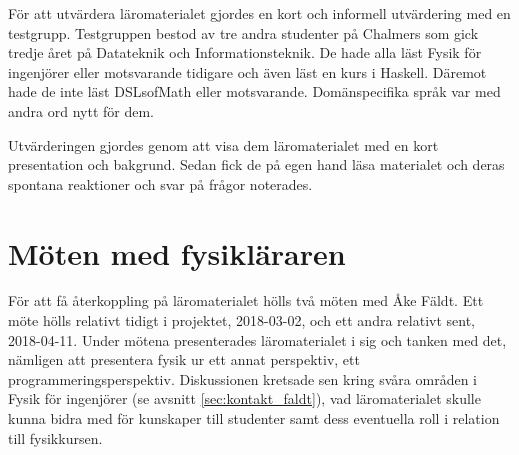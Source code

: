 För att utvärdera läromaterialet gjordes en kort och informell utvärdering med
en testgrupp. Testgruppen bestod av tre andra studenter på Chalmers som gick
tredje året på Datateknik och Informationsteknik. De hade alla läst Fysik för
ingenjörer eller motsvarande tidigare och även läst en kurs i Haskell.
Däremot hade de inte läst DSLsofMath eller motsvarande. Domänspecifika språk var
med andra ord nytt för dem.

Utvärderingen gjordes genom att visa dem läromaterialet med en kort
presentation och bakgrund. Sedan fick de på egen hand läsa materialet och deras
spontana reaktioner och svar på frågor noterades.

\section{Möten med fysikläraren}

För att få återkoppling på läromaterialet hölls två möten med Åke Fäldt. Ett möte hölls relativt
tidigt i projektet, 2018-03-02, och ett andra relativt sent, 2018-04-11.
Under mötena presenterades läromaterialet i sig och tanken med det, nämligen att
presentera fysik ur ett annat perspektiv, ett
programmeringsperspektiv. Diskussionen kretsade sen kring svåra områden i Fysik för
ingenjörer (se avsnitt \ref{sec:kontakt_faldt}), vad läromaterialet skulle kunna
bidra med för kunskaper till studenter samt dess eventuella roll i relation till
fysikkursen.

